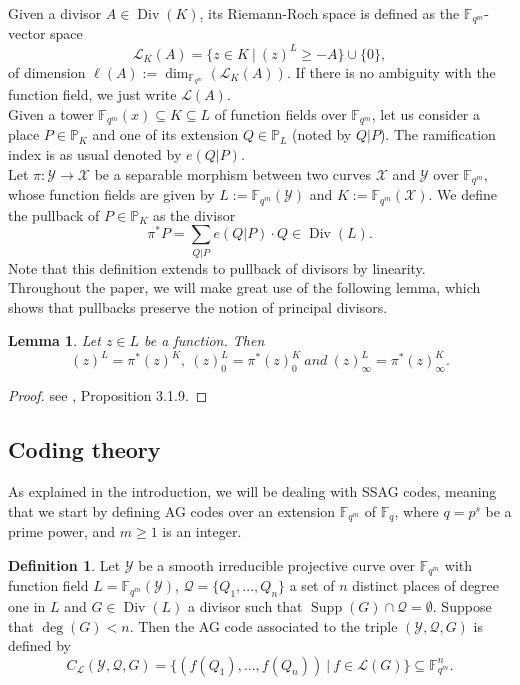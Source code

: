 \documentclass[10pt]{article}
\newtheorem{lem1}[thm]{Lemma}
\theoremstyle{definition}
\theoremstyle{definition}
\theoremstyle{definition}
\newtheorem{def1}[thm]{Definition}
\newcommand{\cd}{\cdot}
\newcommand{\PP}{\mathbb{P}}
\newcommand{\fqm}{\mathbb{F}_{q^m}}
\newcommand{\fq}{\mathbb{F}_q}
\newcommand{\su}{\subseteq}
\newcommand{\X}{\mathcal{X}}
\newcommand{\Y}{\mathcal{Y}}
\newcommand{\QR}{\mathcal{Q}}
\newcommand{\Div}{\operatorname{Div}}
\newcommand{\Supp}{\operatorname{Supp}}
\newcommand{\calL}{\mathcal{L}}
\begin{document}
Given a divisor $A \in \Div(K)$, its Riemann-Roch space is defined as the $\fqm$-vector space
\[\calL_K(A) = \{z \in K \ | \ (z)^L \geq -A\} \cup \{0\},\]
of dimension $\ell(A):= \dim_{\fqm}(\calL_K(A))$. If there is no ambiguity with the function field, we just write $\calL(A)$. \\
Given a tower $\fqm(x) \su K \su L$ of function fields over $\fqm$, let us consider a place  $P \in \PP_K$ and one of its extension $Q \in \PP_L$ (noted by $Q|P$). The ramification index is as usual denoted by $e(Q|P)$. \\
Let $\pi : \Y \rightarrow \X$ be a separable morphism between two curves $\X$ and $\Y$ over $\fqm$, whose function fields are given by $L := \fqm(\Y)$ and $K:=\fqm(\X)$. We define the pullback of $P \in \PP_K$ as the divisor
\[\pi^{*}P = \sum\limits_{Q|P} e(Q|P) \cd Q \in \Div(L).\]
Note that this definition extends to pullback of divisors by linearity. \\
Throughout the paper, we will make great use of the following lemma, which shows that pullbacks preserve the notion of principal divisors.

\begin{lem1} \label{tirarr}
Let $z \in L$ be a function. Then 
\[(z)^L = \pi^*(z)^K, \ (z)^L_0 = \pi^*(z)_0^K \ and \ (z)^L_{\infty} = \pi^*(z)^K_{\infty}.\]
\end{lem1} 

\begin{proof}
see \cite{Sti}, Proposition 3.1.9.
\end{proof}


\subsection{Coding theory}


As explained in the introduction, we will be dealing with SSAG codes, meaning that we start by defining AG codes over an extension $\fqm$ of $\fq$, where $q=p^s$ be a prime power, and $m \geq 1$ is an integer.

\begin{def1} \label{defagcode}
Let $\Y$ be a smooth irreducible projective curve over $\fqm$ with function field $L = \fqm(\Y)$, $\QR = \{Q_1,...,Q_n\}$ a set of $n$ distinct places of degree one in $L$  and $G \in \Div(L)$ a divisor such that $\Supp(G) \cap \QR = \emptyset$. Suppose that $\deg(G)<n$. Then the AG code associated to the triple $(\Y,\QR,G)$ is defined by
\[C_{\calL}(\Y,\QR,G) = \{ (f(Q_1),...,f(Q_n)) \ | \ f \in \calL(G)\} \su \fqm^n.\]
\end{def1}
\end{document}
